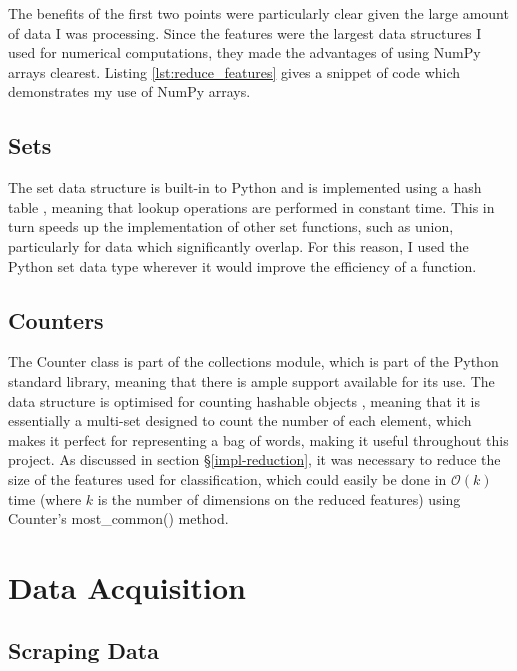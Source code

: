 \documentclass[12pt,a4paper,twoside,openright]{report}
\begin{document}
The benefits of the first two points were particularly clear given the large amount of data I was processing. Since the features were the largest data structures I used for numerical computations, they made the advantages of using NumPy arrays clearest. Listing \ref{lst:reduce_features} gives a snippet of code which demonstrates my use of NumPy arrays.

\subsection{Sets}

The set data structure is built-in to Python and is implemented using a hash table \cite{pythonsetdocs}, meaning that lookup operations are performed in constant time. This in turn speeds up the implementation of other set functions, such as union, particularly for data which significantly overlap. For this reason, I used the Python set data type wherever it would improve the efficiency of a function.

\subsection{Counters} 

The Counter class is part of the collections module, which is part of the Python standard library, meaning that there is ample support available for its use. The data structure is optimised for counting hashable objects \cite{pythoncollectionsdocs}, meaning that it is essentially a multi-set designed to count the number of each element, which makes it perfect for representing a bag of words, making it useful throughout this project. As discussed in section \S\ref{impl-reduction}, it was necessary to reduce the size of the features used for classification, which could easily be done in $\mathcal{O}(k)$ time (where $k$ is the number of dimensions on the reduced features) using Counter's most\_common() method.

\section{Data Acquisition} \label{impl-acquisition}
\subsection{Scraping Data} \label{impl-scraping}
\end{document}
